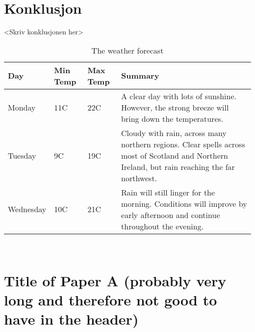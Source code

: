 \documentclass[%
norsk,     %
]{USN-BSc}
\begin{document}
\chapter{Konklusjon}
\label{sec:konklusjon}
<Skriv konklusjonen her>

\begin{table}[!ht]
 \caption{The weather forecast}
  \centering
   \begin{tabular}{| l | l | l | p{5cm} |}
    \hline
    Day & Min Temp & Max Temp & Summary \\ \hline
    Monday & 11C & 22C & A clear day with lots of sunshine.
    However, the strong breeze will bring down the temperatures. \\ \hline
    Tuesday & 9C & 19C & Cloudy with rain, across many northern regions. Clear spells
    across most of Scotland and Northern Ireland,
    but rain reaching the far northwest. \\ \hline
    Wednesday & 10C & 21C & Rain will still linger for the morning.
    Conditions will improve by early afternoon and continue
    throughout the evening. \\
    \hline
    \end{tabular}
\end{table}


~\nocite{*}

\cleardoublepage

\printbibliography[heading=bibintoc]


\appendix



\chapter[Short Title of Paper A]{Title of Paper A (probably very long and therefore not good to have in the header)}
\label{paper-a}
\end{document}
